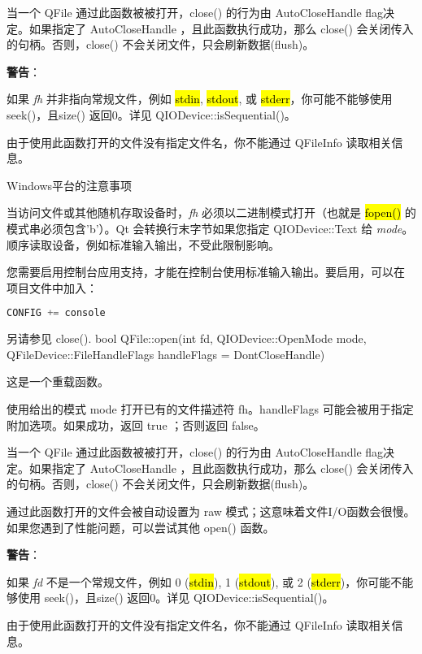 当一个 QFile 通过此函数被被打开，close() 的行为由 AutoCloseHandle flag决定。如果指定了 AutoCloseHandle ，且此函数执行成功，那么 close() 会关闭传入的句柄。否则，close() 不会关闭文件，只会刷新数据(flush)。

\textbf{警告}：

\begin{compactitem}
\item 如果 \emph{fh} 并非指向常规文件，例如 \hl{stdin}, \hl{stdout}, 或 \hl{stderr}，你可能不能够使用 seek()，且size() 返回0。详见 QIODevice::isSequential()。
\item 由于使用此函数打开的文件没有指定文件名，你不能通过 QFileInfo 读取相关信息。
\end{compactitem}

Windows平台的注意事项

当访问文件或其他随机存取设备时，\emph{fh} 必须以二进制模式打开（也就是
\hl{fopen()} 的模式串必须包含'b'）。Qt 会转换行末字节如果您指定
QIODevice::Text 给 \emph{
mode}。顺序读取设备，例如标准输入输出，不受此限制影响。

您需要启用控制台应用支持，才能在控制台使用标准输入输出。要启用，可以在
项目文件中加入：

\begin{lstlisting}[language=C++]
CONFIG += console
\end{lstlisting}

另请参见 close().
bool QFile::open(int fd, QIODevice::OpenMode mode, QFileDevice::FileHandleFlags handleFlags = DontCloseHandle)

这是一个重载函数。

使用给出的模式 mode 打开已有的文件描述符 fh。handleFlags 可能会被用于指定附加选项。如果成功，返回 true ；否则返回 false。

当一个 QFile 通过此函数被被打开，close() 的行为由 AutoCloseHandle flag决定。如果指定了 AutoCloseHandle ，且此函数执行成功，那么 close() 会关闭传入的句柄。否则，close() 不会关闭文件，只会刷新数据(flush)。

通过此函数打开的文件会被自动设置为 raw 模式；这意味着文件I/O函数会很慢。如果您遇到了性能问题，可以尝试其他 open() 函数。

\textbf{警告}：

\begin{compactitem}
\item 如果 \emph{fd} 不是一个常规文件，例如 0 (\hl{stdin}), 1 (\hl{stdout}), 或 2 (\hl{stderr})，你可能不能够使用 seek()，且size() 返回0。详见 QIODevice::isSequential()。
\item 由于使用此函数打开的文件没有指定文件名，你不能通过 QFileInfo 读取相关信息。

\end{compactitem}


